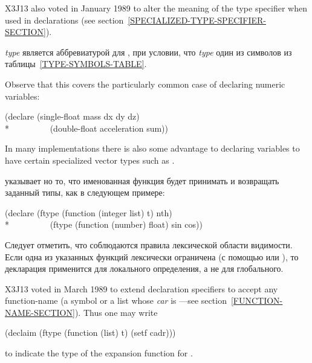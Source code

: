 \begin{flushdesc}
\begin{new}
X3J13 also voted in January 1989
to alter the meaning of the
 type specifier when used in  declarations
(see section~\ref{SPECIALIZED-TYPE-SPECIFIER-SECTION}).
\end{new}

\item[\emph{type}]
является аббревиатурой для ,
при условии, что \emph{type} один из символов из таблицы~\ref{TYPE-SYMBOLS-TABLE}.

\begin{new}
Observe that this covers the particularly common case of declaring
numeric variables:
\begin{lisp}
(declare (single-float mass dx dy dz) \\*
~~~~~~~~~(double-float acceleration sum))
\end{lisp}
In many implementations there is also some advantage to declaring variables
to have certain specialized vector types such as .
\end{new}

\item[\cdf{ftype}]
указывает но то, что именованная функция будет принимать и возвращать заданный
типы, как в следующем примере:
\begin{lisp}
(declare (ftype (function (integer list) t) nth) \\*
~~~~~~~~~(ftype (function (number) float) sin cos))
\end{lisp}
Следует отметить, что соблюдаются правила лексической области видимости. Если
одна из указанных функций лексически ограничена (с помощью  или
), то декларация применится для локального определения, а не для глобального.

\begin{newer}
X3J13 voted in March 1989  to extend 
declaration specifiers
to accept any function-name (a symbol or a list
whose \emph{car} is ---see section~\ref{FUNCTION-NAME-SECTION}).
Thus one may write
\begin{lisp}
(declaim (ftype (function (list) t) (setf cadr)))
\end{lisp}
to indicate the type of the  expansion function for .
\end{newer}


\end{flushdesc}

